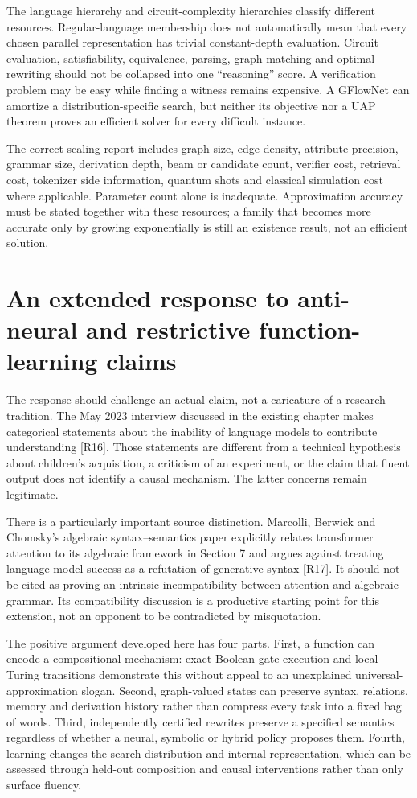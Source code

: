 The language hierarchy and circuit-complexity hierarchies classify different resources. Regular-language membership does not automatically mean that every chosen parallel representation has trivial constant-depth evaluation. Circuit evaluation, satisfiability, equivalence, parsing, graph matching and optimal rewriting should not be collapsed into one ``reasoning'' score. A verification problem may be easy while finding a witness remains expensive. A GFlowNet can amortize a distribution-specific search, but neither its objective nor a UAP theorem proves an efficient solver for every difficult instance.

The correct scaling report includes graph size, edge density, attribute precision, grammar size, derivation depth, beam or candidate count, verifier cost, retrieval cost, tokenizer side information, quantum shots and classical simulation cost where applicable. Parameter count alone is inadequate. Approximation accuracy must be stated together with these resources; a family that becomes more accurate only by growing exponentially is still an existence result, not an efficient solution.

\section{An extended response to anti-neural and restrictive function-learning claims}
\label{sec:wb-chomsky-response}

The response should challenge an actual claim, not a caricature of a research tradition. The May 2023 interview discussed in the existing chapter makes categorical statements about the inability of language models to contribute understanding [R16]. Those statements are different from a technical hypothesis about children's acquisition, a criticism of an experiment, or the claim that fluent output does not identify a causal mechanism. The latter concerns remain legitimate.

There is a particularly important source distinction. Marcolli, Berwick and Chomsky's algebraic syntax--semantics paper explicitly relates transformer attention to its algebraic framework in Section 7 and argues against treating language-model success as a refutation of generative syntax [R17]. It should not be cited as proving an intrinsic incompatibility between attention and algebraic grammar. Its compatibility discussion is a productive starting point for this extension, not an opponent to be contradicted by misquotation.

The positive argument developed here has four parts. First, a function can encode a compositional mechanism: exact Boolean gate execution and local Turing transitions demonstrate this without appeal to an unexplained universal-approximation slogan. Second, graph-valued states can preserve syntax, relations, memory and derivation history rather than compress every task into a fixed bag of words. Third, independently certified rewrites preserve a specified semantics regardless of whether a neural, symbolic or hybrid policy proposes them. Fourth, learning changes the search distribution and internal representation, which can be assessed through held-out composition and causal interventions rather than only surface fluency.

